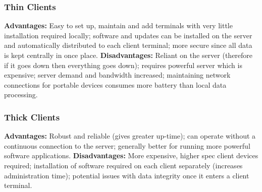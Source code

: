 \documentclass[a4paper,11pt]{article}
\begin{document}
\begin{multicols}{2}
\subsubsection{Thin Clients}
\textbf{Advantages: }Easy to set up, maintain and add terminals with very little installation required locally; software and updates can be installed on the server and automatically distributed to each client terminal; more secure since all data is kept centrally in once place. \newline
\textbf{Disadvantages: }Reliant on the server (therefore if it goes down then everything goes down); requires powerful server which is expensive; server demand and bandwidth increased; maintaining network connections for portable devices consumes more battery than local data processing.
\subsubsection{Thick Clients}
\textbf{Advantages: }Robust and reliable (gives greater up-time); can operate without a continuous connection to the server; generally better for running more powerful software applications.\newline
\textbf{Disadvantages: }More expensive, higher spec client devices required; installation of software required on each client separately (increases administration time); potential issues with data integrity once it enters a client terminal.




\end{multicols}
\end{document}
